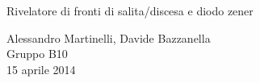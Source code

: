 \begin{center}

     	{\huge Rivelatore di fronti di salita/discesa e diodo zener}

	\vspace{0.3cm}

      	{\large Alessandro Martinelli, Davide Bazzanella} \\
     	\vspace{0.2cm}
		{\huge Gruppo B10} \\
	
	\vspace{0.1cm}
      	{15 aprile 2014}

\end{center}
